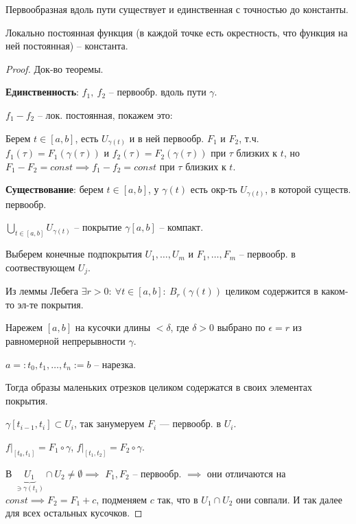 \begin{theorem}
    Первообразная вдоль пути существует и единственная с точностью до константы.
\end{theorem}
\begin{lemma}
    Локально постоянная функция (в каждой точке есть окрестность, что функция на ней постоянная) -- константа.
\end{lemma}
\begin{proof}
    Док-во теоремы.

    \textbf{Единственность}: $f_1, \ f_2$ -- первообр. вдоль пути $\gamma$.

    $f_1 - f_2$ -- лок. постоянная, покажем это:

    Берем $t \in [a, b]$, есть $U_{\gamma(t)}$ и в ней первообр. $F_1$ и $F_2$, т.ч. $f_1(\tau) = F_1(\gamma(\tau))$ и $f_2(\tau) = F_2(\gamma(\tau))$ при $\tau$ близких к $t$, но $F_1 - F_2 = const \implies f_1 - f_2 = const$ при $\tau$ близких к $t$.


    \textbf{Существование}: берем $t \in [a, b]$, у $\gamma(t)$ есть окр-ть $U_{\gamma(t)}$, в которой существ. первообр.
    

    $\bigcup_{t \in [a, b]} { U_{\gamma(t)} }$ -- покрытие $\gamma [a, b]$ -- компакт.

    Выберем конечные подпокрытия $U_1, \dots, U_m$ и $F_1, \dots, F_m$ -- первообр. в соотвествующем $U_j$.

    Из леммы Лебега $\exists r > 0: \ \forall t \in [a, b]: \ B_r(\gamma(t))$ целиком содержится в каком-то эл-те покрытия.

    Нарежем $[a, b]$ на кусочки длины $< \delta$, где $\delta > 0$ выбрано по $\epsilon = r$ из равномерной непрерывности $\gamma$.


    $a =: t_0, t_1, \dots, t_n := b$ -- нарезка.

    Тогда образы маленьких отрезков целиком содержатся в своих элементах покрытия.

    $\gamma [t_{i-1}, t_i] \subset U_i$, так занумеруем $F_i$ --- первообр. в $U_i$.

    $f|_{[t_0, t_1]} = F_1 \circ \gamma$, $f|_{[t_1, t_2]} = F_2 \circ \gamma$.

    В $\underbrace{U_1}_{\ni \gamma(t_1)} \cap U_2 \not = \emptyset \implies$ $F_1, F_2$ -- первообр. $\implies$ они отличаются на $const \implies F_2 = F_1 + c$, подменяем $c$ так, что в $U_1 \cap U_2$ они совпали. И так далее для всех остальных кусочков.
\end{proof}

